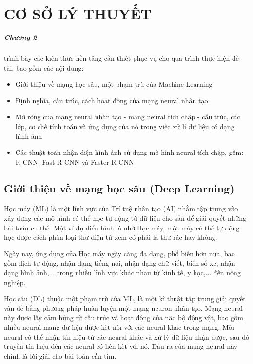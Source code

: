 \chapter{CƠ SỞ LÝ THUYẾT}
\label{chap:background}
\paragraph{Chương 2} trình bày các kiến thức nền tảng cần thiết phục vụ cho quá trình thực hiện đề tài, bao gồm các nội dung:

\begin{itemize}
\item Giới thiệu về mạng học sâu, một phạm trù của Machine Learning

\item Định nghĩa, cấu trúc, cách hoạt động của mạng neural nhân tạo

\item Mở rộng của mạng neural nhân tạo - mạng neural tích chập - cấu trúc, các lớp, cơ chế tính toán và ứng dụng của nó trong việc xử lí dữ liệu có dạng hình ảnh

\item Các thuật toán nhận diện hình ảnh sử dụng mô hình neural tích chập, gồm: R-CNN, Fast R-CNN và Faster R-CNN
\end{itemize}

\section{Giới thiệu về mạng học sâu (Deep Learning)}
Học máy (ML) là một lĩnh vực của Trí tuệ nhân tạo (AI) nhằm tập trung vào xây dựng các mô hình có thể học tự động từ dữ liệu cho sẵn để giải quyết những bài toán cụ thể. Một ví dụ điển hình là nhờ Học máy, một máy có thể tự động học được cách phân loại thư điện tử xem có phải là thư rác hay không. 

Ngày nay, ứng dụng của Học máy ngày càng đa dạng, phổ biến hơn nữa, bao gồm dịch tự động, nhận dạng tiếng nói, nhận dạng chữ viết, biển số xe, nhận dạng hình ảnh,... trong nhiều lĩnh vực khác nhau từ kinh tế, y học,... đến nông nghiệp. 

Học sâu (DL) thuộc một phạm trù của ML, là một kĩ thuật tập trung giải quyết vấn đề bằng phương pháp huấn luyện một mạng neuron nhân tạo. Mạng neural này được lấy cảm hứng từ cấu trúc và hoạt động của não bộ động vật, bao gồm nhiều neural mang dữ liệu được kết nối với các neural khác trong mạng. Mỗi neural có thể nhận tín hiệu từ các neural khác và xử lý dữ liệu nhận được, sau đó truyền tín hiệu đến các neural có liên kết với nó. Đầu ra của mạng neural này chính là lời giải cho bài toán cần tìm.

